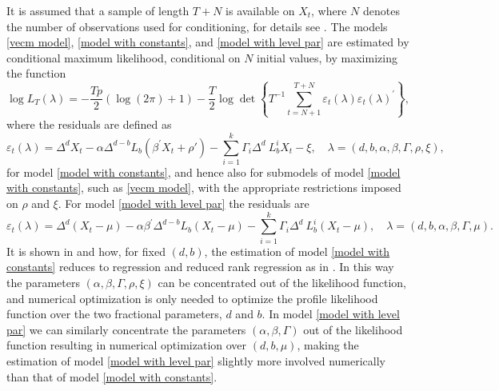 \documentclass[article]{jss}
\begin{document}
It is assumed that a sample of length $T+N$ is available on $X_t$, where $N$ denotes the number of observations used for conditioning, for details see \cite{johansen2014initial}. The models \eqref{vecm model}, \eqref{model with constants}, and \eqref{model with level par} are estimated by conditional maximum likelihood, conditional on $N$ initial values, by maximizing the function
\begin{equation}
\log L_{T}(\lambda ) = - \frac{T p}{2} ( \log(2\pi) + 1) 
-\frac{T}{2}\log \det \left\{ T^{-1}\sum_{t=N+1}^{T+N}\varepsilon _{t}(\lambda )\varepsilon _{t}(\lambda)^{\prime }\right\},  \label{Cond Like}
\end{equation}
where the residuals are defined as
\begin{equation}
\varepsilon _{t}(\lambda ) = \Delta^{d}X_{t}- \alpha \Delta^{d-b} L_{b} (\beta^{\prime} X_{t} + \rho') 
 - \sum_{i=1}^{k}\Gamma_{i}\Delta^{d}\ L_{b}^{i}X_{t} - \xi, \quad
\lambda =(d,b,\alpha,\beta,\Gamma,\rho,\xi),
\label{epstau}
\end{equation}
for model \eqref{model with constants}, and hence also for submodels of model \eqref{model with constants}, such as \eqref{vecm model}, with the appropriate restrictions imposed on $\rho$ and $\xi$. For model \eqref{model with level par} the residuals are
\begin{equation}
\varepsilon _{t}(\lambda ) = \Delta^{d}(X_{t}-\mu) -  \alpha \beta^{\prime} \Delta^{d-b} L_{b} (X_{t} - \mu) 
 - \sum_{i=1}^{k}\Gamma_{i}\Delta^{d}\ L_{b}^{i}(X_{t} - \mu), \quad
\lambda =(d,b,\alpha,\beta,\Gamma,\mu).
\label{epstau level}
\end{equation}
It is shown in \cite{johansen2012likelihood} and \cite{Dolatabadi2014} how, for fixed $(d,b)$, the estimation of model \eqref{model with constants} reduces to regression and reduced rank regression as in \cite{Johansen1995}. In this way the parameters $(\alpha ,\beta,\Gamma,\rho,\xi)$ can be concentrated out of the likelihood function, and numerical optimization is only needed to optimize the profile likelihood function over the two fractional parameters, $d$ and $b$. In model \eqref{model with level par} we can similarly concentrate the parameters $(\alpha ,\beta,\Gamma)$ out of the likelihood function resulting in numerical optimization over $(d,b,\mu)$, making the estimation of model \eqref{model with level par} slightly more involved numerically than that of model \eqref{model with constants}.
\end{document}
